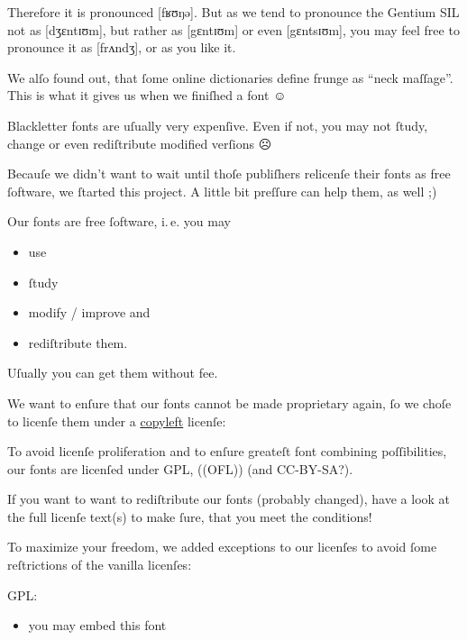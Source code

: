 \documentclass[
  ngerman,
  titlepage=no
]{scrartcl}
\newcommand*\smiley{{\larger[3]☺}} %
\newcommand*\frowney{{\larger[3]☹}}
\newcommand*\winkey{;)}       %
\newcommand*\spokenlanguage[1]{\mbox{#1}} %
\let\addpart\addsec   %
\begin{document}
Therefore it is pronounced \spokenlanguage{[fʁʊŋə]}. But as we tend to pronounce the Gentium SIL
not as \spokenlanguage{[dʒɛntɪʊm]}, but rather as \spokenlanguage{[gɛntɪʊm]} or even \spokenlanguage{[gɛntsɪʊm]}, you may feel free to pronounce it as \spokenlanguage{[frʌndʒ]}, or as you like it.

We alſo found out, that ſome online dictionaries define frunge as “neck
maſſage”. This is what it gives us when we finiſhed a font \smiley

\addpart{We Care About Your Freedom}
Blackletter fonts are uſually very expenſive. Even if not, you may not ſtudy,
change or even rediſtribute modified verſions \frowney

Becauſe we didn’t want to wait until thoſe publiſhers relicenſe their fonts as
free ſoftware, we ſtarted this project. A little bit preſſure can help them, as
well \winkey

Our fonts are free ſoftware, i.\,e. you may
\begin{itemize}
\item use
\item ſtudy
\item modify / improve and
\item rediſtribute them.
\end{itemize}

Uſually you can get them without fee.

We want to enſure that our fonts cannot be made proprietary again, ſo we
choſe to licenſe them under a
\href{http://en.wikipedia.org/wiki/Copyleft}{copyleft} licenſe:

To avoid licenſe proliferation and to enſure greateſt font combining
poſſibilities, our fonts are licenſed under GPL, ((OFL)) (and CC-BY-SA?). 

If you want to want to rediſtribute our fonts (probably changed), have a look at
the full licenſe text(s) to make ſure, that you meet the conditions!

To maximize your freedom, we added exceptions to our licenſes to avoid ſome
reſtrictions of the vanilla licenſes:

GPL:
\begin{itemize}
\item you may embed this font
\end{itemize}
\end{document}

